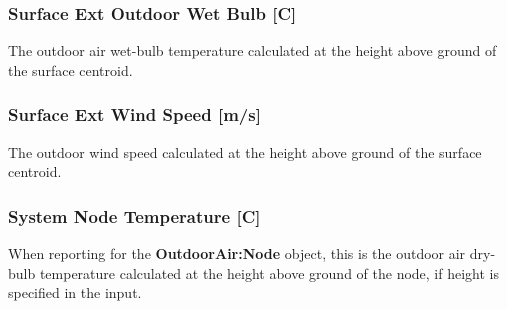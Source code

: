 \subsubsection{Surface Ext Outdoor Wet Bulb {[}C{]}}\label{surface-ext-outdoor-wet-bulb-c}

The outdoor air wet-bulb temperature calculated at the height above ground of the surface centroid.

\subsubsection{Surface Ext Wind Speed {[}m/s{]}}\label{surface-ext-wind-speed-ms}

The outdoor wind speed calculated at the height above ground of the surface centroid.

\subsubsection{System Node Temperature {[}C{]}}\label{system-node-temperature-c}

When reporting for the \textbf{OutdoorAir:Node} object, this is the outdoor air dry-bulb temperature calculated at the height above ground of the node, if height is specified in the input.
